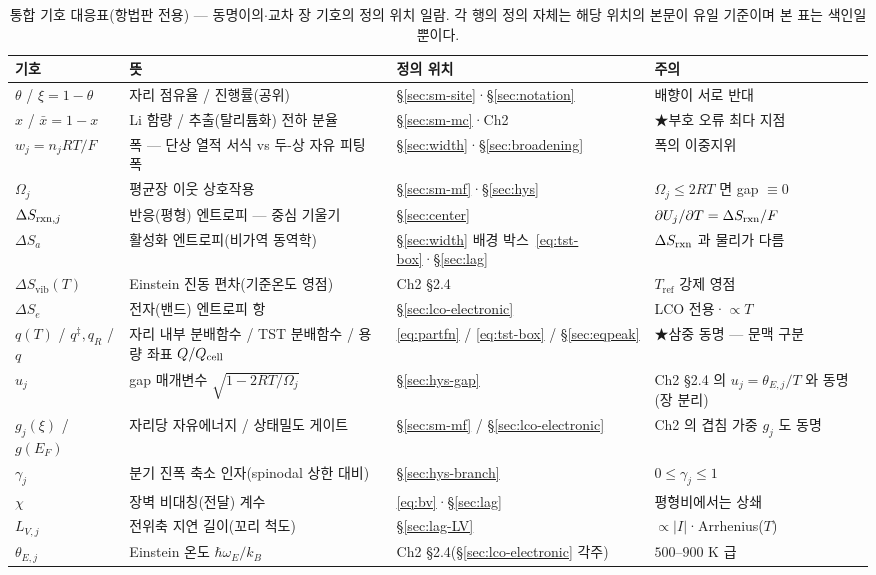 \begin{table}[h]
\centering
\small
\begin{tabular}{p{} p{} p{} p{}}
\toprule
기호 & 뜻 & 정의 위치 & 주의 \\
\midrule
$\theta$ / $\xi=1-\theta$ & 자리 점유율 / 진행률(공위) & \S\ref{sec:sm-site}·\S\ref{sec:notation} & 배향이 서로 반대 \\
$x$ / $\bar x=1-x$ & Li 함량 / 추출(탈리튬화) 전하 분율 & \S\ref{sec:sm-mc}·Ch2 & ★부호 오류 최다 지점 \\
$w_j=n_jRT/F$ & 폭 --- 단상 열적 서식 vs 두-상 자유 피팅 폭 & \S\ref{sec:width}·\S\ref{sec:broadening} & 폭의 이중지위 \\
$\Omega_j$ & 평균장 이웃 상호작용 & \S\ref{sec:sm-mf}·\S\ref{sec:hys} & $\Omega_j\le2RT$ 면 gap $\equiv0$ \\
$\Delta S_{\mathrm{rxn},j}$ & 반응(평형) 엔트로피 --- 중심 기울기 & \S\ref{sec:center} & $\partial U_j/\partial T=\Delta S_{\mathrm{rxn}}/F$ \\
$\Delta S_a$ & 활성화 엔트로피(비가역 동역학) & \S\ref{sec:width} 배경 박스~\eqref{eq:tst-box}·\S\ref{sec:lag} & $\Delta S_{\mathrm{rxn}}$ 과 물리가 다름 \\
$\Delta S_{\mathrm{vib}}(T)$ & Einstein 진동 편차(기준온도 영점) & Ch2 \S2.4 & $T_\mathrm{ref}$ 강제 영점 \\
$\Delta S_e$ & 전자(밴드) 엔트로피 항 & \S\ref{sec:lco-electronic} & LCO 전용·$\propto T$ \\
$q(T)$ / $q^{\ddagger},q_R$ / $q$ & 자리 내부 분배함수 / TST 분배함수 / 용량 좌표 $Q/Q_{\mathrm{cell}}$ & \eqref{eq:partfn} / \eqref{eq:tst-box} / \S\ref{sec:eqpeak} & ★삼중 동명 --- 문맥 구분 \\
$u_j$ & gap 매개변수 $\sqrt{1-2RT/\Omega_j}$ & \S\ref{sec:hys-gap} & Ch2 \S2.4 의 $u_j{=}\theta_{E,j}/T$ 와 동명(장 분리) \\
$g_j(\xi)$ / $g(E_F)$ & 자리당 자유에너지 / 상태밀도 게이트 & \S\ref{sec:sm-mf} / \S\ref{sec:lco-electronic} & Ch2 의 겹침 가중 $g_j$ 도 동명 \\
$\gamma_j$ & 분기 진폭 축소 인자(spinodal 상한 대비) & \S\ref{sec:hys-branch} & $0\le\gamma_j\le1$ \\
$\chi$ & 장벽 비대칭(전달) 계수 & \eqref{eq:bv}·\S\ref{sec:lag} & 평형비에서는 상쇄 \\
$L_{V,j}$ & 전위축 지연 길이(꼬리 척도) & \S\ref{sec:lag-LV} & $\propto|I|$·Arrhenius($T$) \\
$\theta_{E,j}$ & Einstein 온도 $\hbar\omega_E/k_B$ & Ch2 \S2.4(\S\ref{sec:lco-electronic} 각주) & $500$--$900$ K 급 \\
\bottomrule
\end{tabular}
\caption{통합 기호 대응표(항법판 전용) --- 동명이의$\cdot$교차 장 기호의 정의 위치 일람. 각 행의 정의
자체는 해당 위치의 본문이 유일 기준이며 본 표는 색인일 뿐이다.}
\label{tab:navsymbols}
\end{table}

